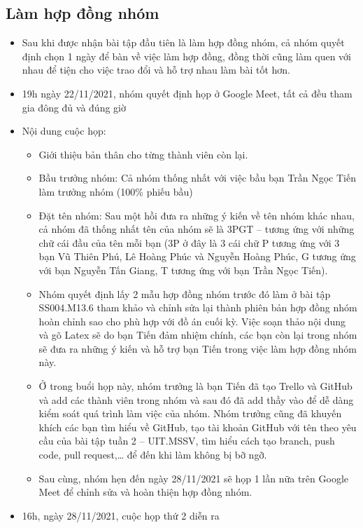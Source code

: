\documentclass[13pt,a4paper]{article}
\begin{document}
\subsection{Làm hợp đồng nhóm }
\begin{itemize}
    \item Sau khi được nhận bài tập đầu tiên là làm hợp đồng nhóm, cả nhóm quyết định chọn 1 ngày để bàn về việc làm hợp đồng, đồng thời cũng làm quen với nhau để tiện cho việc trao đổi và hỗ trợ nhau làm bài tốt hơn.
    \item 19h ngày 22/11/2021, nhóm quyết định họp ở Google Meet, tất cả đều tham gia đông đủ và đúng giờ
    \item Nội dung cuộc họp:
        \begin{itemize}
            \item Giới thiệu bản thân cho từng thành viên còn lại.
            \item Bầu trưởng nhóm:  Cả nhóm thống nhất với việc bầu bạn Trần Ngọc Tiến làm trưởng nhóm (100\% phiếu bầu)
            \item Đặt tên nhóm: Sau một hồi đưa ra những ý kiến về tên nhóm khác nhau, cả nhóm đã thống nhất tên của nhóm sẽ là 3PGT – tương ứng với những chữ cái đầu của tên mỗi bạn (3P ở đây là 3 cái chữ P tương ứng với 3 bạn Vũ Thiên Phú, Lê Hoàng Phúc và Nguyễn Hoàng Phúc, G tương ứng với bạn Nguyễn Tấn Giang, T tương ứng với bạn Trần Ngọc Tiến).
            \item Nhóm quyết định lấy 2 mẫu hợp đồng nhóm trước đó làm ở bài tập SS004.M13.6 tham khảo và chỉnh sửa lại thành phiên bản hợp đồng nhóm hoàn chỉnh sao cho phù hợp với đồ án cuối kỳ.  Việc soạn thảo nội dung và gõ Latex sẽ do bạn Tiến đảm nhiệm chính, các bạn còn lại trong nhóm sẽ đưa ra những ý kiến và hỗ trợ bạn Tiến trong việc làm hợp đồng nhóm này.
            \item Ở trong buổi họp này, nhóm trưởng là bạn Tiến đã tạo Trello và GitHub và add các thành viên trong nhóm và sau đó đã add thầy vào để dễ dàng kiểm soát quá trình làm việc của nhóm. Nhóm trưởng cũng đã khuyến khích các bạn tìm hiểu về GitHub, tạo tài khoản GitHub với tên theo yêu cầu của bài tập tuần 2 – UIT.MSSV, tìm hiểu cách tạo branch, push code, pull request,… để đến khi làm không bị bỡ ngỡ.
            \item Sau cùng, nhóm hẹn đến ngày 28/11/2021 sẽ họp 1 lần nữa trên Google Meet để chỉnh sửa và hoàn thiện hợp đồng nhóm.
        \end{itemize}
    \item 16h, ngày 28/11/2021, cuộc họp thứ 2 diễn ra

\end{itemize}
\end{document}
